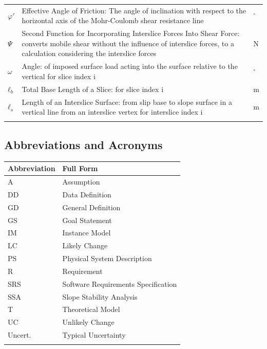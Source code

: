 \documentclass[12pt]{article}
\begin{document}
\begin{longtabu}{l X[l] l}
\\
$φ'$ & Effective Angle of Friction: The angle of inclination with respect to the horizontal axis of the Mohr-Coulomb shear resistance line & ${}^{\circ}$
\\
$Ψ$ & Second Function for Incorporating Interslice Forces Into Shear Force: converts mobile shear without the influence of interslice forces, to a calculation considering the interslice forces & N
\\
$ω$ & Angle: of imposed surface load acting into the surface relative to the vertical for slice index i & ${}^{\circ}$
\\
${ℓ_{b}}$ & Total Base Length of a Slice: for slice index i & m
\\
${ℓ_{s}}$ & Length of an Interslice Surface: from slip base to slope surface in a vertical line from an interslice vertex for interslice index i & m
\\
\bottomrule
\label{Table:ToS}
\end{longtabu}
\subsection{Abbreviations and Acronyms}
\label{Sec:TAbbAcc}
\begin{longtable*}{l l}
\toprule
Abbreviation & Full Form
\\
\midrule
A & Assumption
\\
DD & Data Definition
\\
GD & General Definition
\\
GS & Goal Statement
\\
IM & Instance Model
\\
LC & Likely Change
\\
PS & Physical System Description
\\
R & Requirement
\\
SRS & Software Requirements Specification
\\
SSA & Slope Stability Analysis
\\
T & Theoretical Model
\\
UC & Unlikely Change
\\
Uncert. & Typical Uncertainty
\\
\bottomrule
\label{Table:TAbbAcc}
\end{longtable*}
\end{document}
